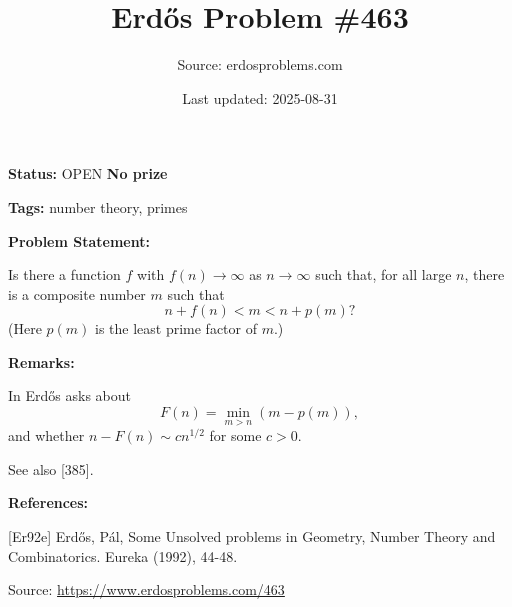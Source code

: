 \documentclass{article}
\title{Erd\H{o}s Problem \#463}
\date{Last updated: 2025-08-31}
\author{Source: erdosproblems.com}
\begin{document}
\maketitle

\noindent\textbf{Status:} OPEN \quad \textbf{No prize}

\noindent\textbf{Tags:} number theory, primes

\medskip
\noindent\textbf{Problem Statement:}

Is there a function $f$ with $f(n)\to \infty$ as $n\to \infty$ such that, for all large $n$, there is a composite number $m$ such that\[n+f(n)<m<n+p(m)?\](Here $p(m)$ is the least prime factor of $m$.)

\bigskip
\noindent\textbf{Remarks:}

In \cite{Er92e} Erd\H{o}s asks about\[F(n)=\min_{m>n}(m-p(m)),\]and whether $n-F(n)\sim cn^{1/2}$ for some $c>0$.

See also [385].

\bigskip
\noindent\textbf{References:}

[Er92e] Erd\H{o}s, P\'{a}l, Some Unsolved problems in Geometry, Number Theory and Combinatorics. Eureka (1992), 44-48.

\bigskip
\noindent\small{Source: \url{https://www.erdosproblems.com/463}}
\end{document}
